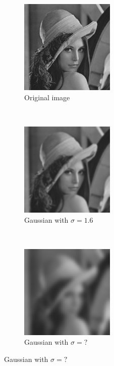 \documentclass{article}
\begin{document}
	\begin{figure}[ht]
		\begin{center}
			\begin{subfigure}[normla]{0.3\textwidth}
				\includegraphics[width=4.5cm]{images/lenna.png}
				\caption{Original image}
				\label{subfig:org}
			\end{subfigure}
			~
			\begin{subfigure}[normla]{0.3\textwidth}
				\includegraphics[width=4.5cm]{images/gaussian_at_sigma_3.png}
				\caption{Gaussian with $\sigma = 1.6$}
				\label{subfig:gauss1}
			\end{subfigure}
			~
			\begin{subfigure}[normla]{0.3\textwidth}
				\includegraphics[width=4.5cm]{images/gaussian_at_sigma_10.png}
				\caption{Gaussian with $\sigma = ?$}
				\label{subfig:gauss2}
			\end{subfigure}
		
			\vspace{0.3cm}
		

\end{center}
\end{figure}
\end{document}
